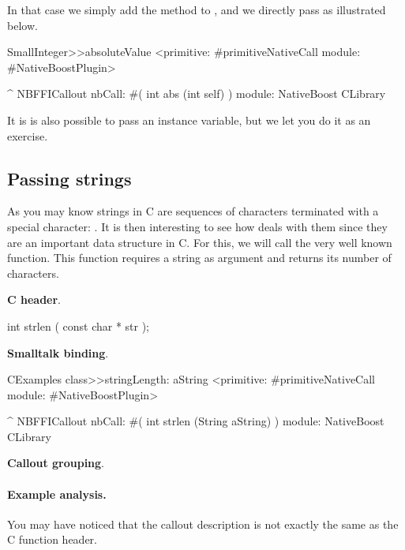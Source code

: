 \documentclass[a4paper,10pt,twoside]{book}
\begin{document}
In that case we simply add the  method to , and we directly pass  as illustrated below.

\begin{code}{}
SmallInteger>>absoluteValue
	<primitive: #primitiveNativeCall module: #NativeBoostPlugin>
	
	^ NBFFICallout nbCall: #( int abs (int self) ) module: NativeBoost CLibrary
\end{code}

It is is also possible to pass an instance variable, but we let you do it as an exercise.

\subsection{Passing strings}
As you may know strings in C are sequences of characters terminated with a special character: \ct{\0}. 
It is then interesting to see how \NativeBoost deals with them since they are an important data structure in C. 
For this, we will call the very well known  function. 
This function requires a string as argument and returns its number of characters. 

\textbf{C header}. 
\begin{code}{}
int strlen ( const char * str );
\end{code}

\textbf{Smalltalk binding}. 
\begin{code}{}
CExamples class>>stringLength: aString
	<primitive: #primitiveNativeCall module: #NativeBoostPlugin>
	
	^ NBFFICallout nbCall: #( int strlen (String aString) ) module: NativeBoost CLibrary
\end{code}

\textbf{Callout grouping}. 




\paragraph{Example analysis.} You may have noticed that the callout description is not exactly the same as the C function header. 
\end{document}
